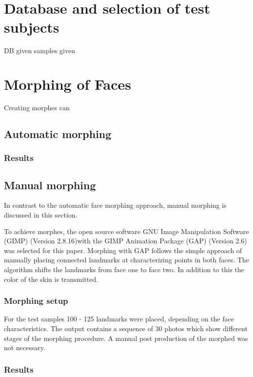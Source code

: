 \section{Database and selection of test subjects}
DB given samples given


\section{Morphing of Faces}
Creating morphes can
\subsection{Automatic morphing}

\subsubsection{Results}

\subsection*{Manual morphing}
In contrast to the automatic face morphing approach, manual morphing is discussed in this section. 

To achieve morphes, the open source software GNU Image Manipulation Software (GIMP) (Version 2.8.16)with the GIMP Animation Package (GAP) (Version 2.6) was selected for this paper. Morphing with GAP follows the simple approach of manually placing connected landmarks at characterizing points in both faces. The algorithm shifts the landmarks from face one to face two. In addition to this the color of the skin is transmitted. 

\subsubsection*{Morphing setup}
For the test samples 100 - 125 landmarks were placed, depending on the face characteristics. The output contains a sequence of 30 photos which show different stages of the morphing procedure. A manual post production of the morphed was not necessary. 

\subsubsection*{Results}

